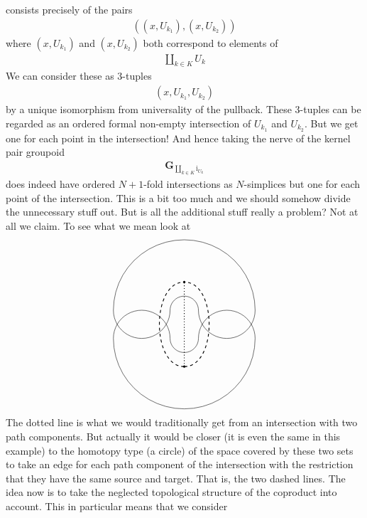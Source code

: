 consists precisely of the pairs
\begin{align*}
  \left(
    (x,U_{k_{1}}),
    (x,U_{k_{2}})
  \right)
\end{align*}
where $(x,U_{k_{1}})$ and $(x,U_{k_{2}})$ both correspond to elements of
\begin{align*}
  \coprod_{k \in K}
  U_{k}
\end{align*}
We can consider these as $3$-tuples
\begin{align*}
  \left(
    x,
    U_{k_{1}},
    U_{k_{2}}
  \right)
\end{align*}
by a unique isomorphism from universality of the pullback. These $3$-tuples can be regarded as an ordered formal non-empty intersection of $U_{k_{1}}$ and $U_{k_{2}}$. But we get one for each point in the intersection! And hence taking the nerve of the kernel pair groupoid
\begin{align*}
  \mathbf{G}_{\coprod_{k \in K}\mathrm{i}_{U_{k}}}
\end{align*}
does indeed have ordered $N + 1$-fold intersections as $N$-simplices but one for each point of the intersection. This is a bit too much and we should somehow divide the unnecessary stuff out. But is all the additional stuff really a problem? Not at all we claim. To see what we mean look at
\[
\begin{tikzpicture}[scale=0.5]
  \coordinate (u1) at (0,-3);
  \coordinate (u2) at (0,3);
  \draw[dotted,thick]
    (u1)
    --
    (u2);
  \draw[dashed,thick]
    (u1)
    to[bend left=90]
    (u2);
  \draw[dashed,thick]
    (u1)
    to[bend right=90]
    (u2);
  \draw[domain=0:180]
    plot
    ({cos(\x)},{sin(\x)+1});
  \draw[domain=0:180]
    plot
    ({5*cos(\x)},{5*sin(\x)+1});
  \draw[domain=180:360]
    plot
    ({cos(\x)},{sin(\x)-1});
  \draw[domain=180:360]
    plot
    ({5*cos(\x)},{5*sin(\x)-1});
  \draw[domain=180:360]
    plot
    ({2*cos(\x)-3},{2*sin(\x)+1});
  \draw[domain=180:360]
    plot
    ({2*cos(\x)+3},{2*sin(\x)+1});
  \draw[domain=0:180]
    plot
    ({2*cos(\x)-3},{2*sin(\x)-1});
  \draw[domain=0:180]
    plot
    ({2*cos(\x)+3},{2*sin(\x)-1});
  \filldraw
    (u1)
    circle
    [radius=2pt];
  \filldraw
    (u2)
    circle
    [radius=2pt];
\end{tikzpicture}
\]
The dotted line is what we would traditionally get from an intersection with two path components. But actually it would be closer (it is even the same in this example) to the homotopy type (a circle) of the space covered by these two sets to take an edge for each path component of the intersection with the restriction that they have the same source and target. That is, the two dashed lines. The idea now is to take the neglected topological structure of the coproduct into account. This in particular means that we consider

